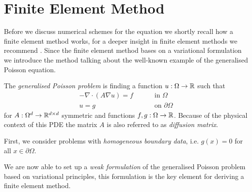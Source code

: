 \section{Finite Element Method}
Before we discuss numerical schemes for the \MA equation we shortly recall how a finite element method works, for a deeper insight in finite element methods we recommend \cite{Braess2003, BS2002}. Since the finite element method bases on a variational formulation we introduce the method talking about the well-known example of the generalised Poisson equation. 


\begin{definition} \label{def: General Poisson Problem}
The \emph{generalised Poisson problem} is finding a function $u:\Omega \rightarrow \mathbb{R}$ such that 
\begin{align}
	-\nabla \cdot (A \nabla u) = f \qquad &\text{ in }\Omega \label{eq: poisson eq} \\
	u = g \qquad &\text{ on } \partial \Omega    \label{eq: poisson bc}
\end{align}
for $ A:\Omega^d \rightarrow \mathbb{R}^{d \times d}$ symmetric and functions $f,g:\Omega \rightarrow \mathbb{R} $. 
Because of the physical context of this PDE the matrix $A$ is also referred to as \emph{diffusion matrix}.
\end{definition}

First, we consider problems with \emph{homogeneous boundary data}, i.e. $g(x) = 0$ for all $x \in \partial \Omega$.

We are now able to set up a \emph{weak formulation} of the generalised Poisson problem based on variational principles, this formulation is the key element for deriving a finite element method.

